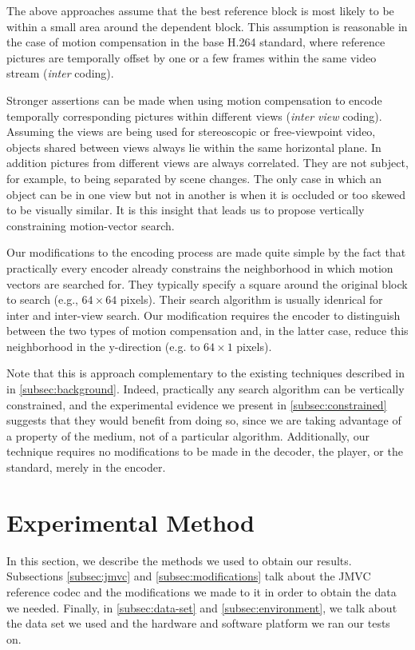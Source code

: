 \documentclass{sig-alternate-05-2015}
\begin{document}
The above approaches assume that the best reference block is most likely to be
within a small area around the dependent block. This assumption is reasonable
in the case of motion compensation in the base H.264 standard, where reference
pictures are temporally offset by one or a few frames within the same video
stream ({\it inter} coding).

Stronger assertions can be made when using motion compensation to encode
temporally corresponding pictures within different views ({\it inter view}
coding). Assuming the views are being used for stereoscopic or free-viewpoint
video, objects shared between views always lie within the same horizontal plane.
In addition pictures from different views are always correlated. They are not
subject, for example, to being separated by scene changes. The only case in
which an object can be in one view but not in another is when it is occluded or
too skewed to be visually similar. It is this insight that leads us to propose
vertically constraining motion-vector search.

Our modifications to the encoding process are made quite simple by the fact that
practically every encoder already constrains the neighborhood in which motion
vectors are searched for. They typically specify a square around the original
block to search (e.g., $64\times 64$ pixels). Their search algorithm is usually
idenrical for inter and inter-view search. Our modification requires the encoder
to distinguish between the two types of motion compensation and, in the latter
case, reduce this neighborhood in the y-direction (e.g. to $64\times 1$ pixels).

Note that this is approach complementary to the existing techniques described in
in \ref{subsec:background}. Indeed, practically any search algorithm can be
vertically constrained, and the experimental evidence we present in
\ref{subsec:constrained} suggests that they would benefit from doing so, since
we are taking advantage of a property of the medium, not of a particular
algorithm. Additionally, our technique requires no modifications to be made in
the decoder, the player, or the standard, merely in the encoder.

\section{Experimental Method} %
\label{sec:method} %
In this section, we describe the methods we used to obtain our results.
Subsections \ref{subsec:jmvc} and \ref{subsec:modifications} talk about the JMVC
reference codec and the modifications we made to it in order to obtain the data
we needed. Finally, in \ref{subsec:data-set} and \ref{subsec:environment}, we
talk about the data set we used and the hardware and software platform we ran
our tests on.
\end{document}
